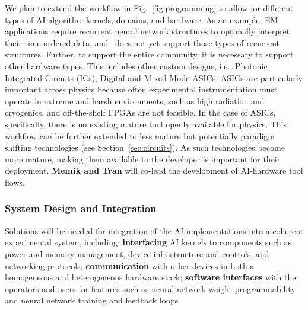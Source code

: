We plan to extend the workflow in Fig.~\ref{fig:programming} to allow for different types of AI algorithm kernels, domains, and hardware. As an example, EM applications require recurrent neural network structures to optimally interpret their time-ordered data; and \hlsfml~does not yet support those types of recurrent structures.  Further, to support the entire community, it is necessary to support other hardware types.  This includes other custom designs, i.e., Photonic Integrated Circuits (ICs), Digital and  Mixed Mode ASICs. ASICs are particularly important across physics because often experimental instrumentation must operate in extreme and harsh environments, such as high radiation and cryogenics, and off-the-shelf FPGAs are not feasible.  In the case of ASICs, specifically, there is no existing mature tool openly available for physics. This workflow can be further extended to less mature but potentially paradigm shifting technologies (see Section~\ref{sec:circuits}).  As such technologies become more mature, making them available to the developer is important for their deployment. {\bf Memik and Tran} will co-lead the development of AI-hardware tool flows.



\subsubsection{System Design and Integration} \label{sec:Integration}
Solutions will be needed for integration of the AI implementations into a coherent experimental system, including: {\bf interfacing} AI kernels to components such as power and memory management, device infrastructure and controls, and networking protocols; {\bf communication} with other devices in both a homogeneous and heterogeneous hardware stack; {\bf software interfaces} with the operators and users for features such as neural network weight programmability and neural network training and feedback loops.

